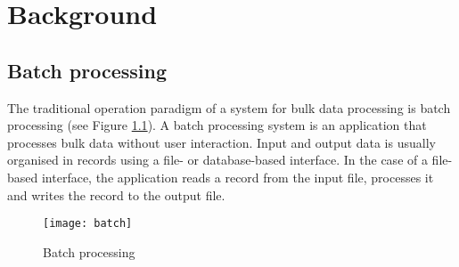 \chapter{Background}\label{ch:background}

\section{Batch processing}\label{sec:batch_processing}
The traditional operation paradigm of a system for bulk data processing is batch processing (see Figure \ref{fig:batch_processing}). A batch processing system is an application that processes bulk data without user interaction. Input and output data is usually organised in records using a file- or database-based interface. In the case of a file-based interface, the application reads a record from the input file, processes it and writes the record to the output file.
\begin{figure}[h!]
	\centering
	\texttt{[image: batch]}
	\caption{Batch processing}
	\label{fig:batch_processing}
\end{figure}

